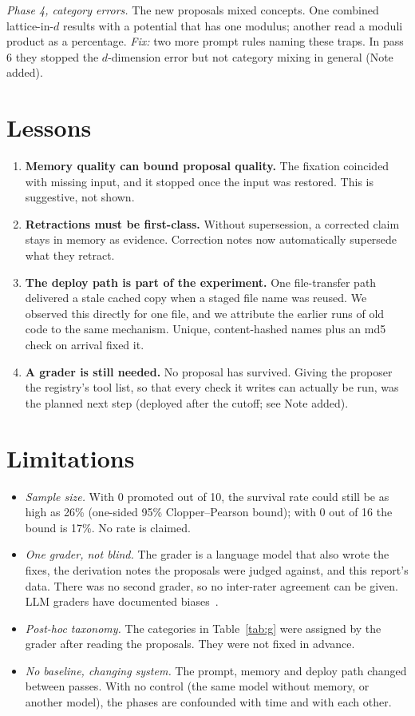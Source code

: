 \documentclass[aps,prd,twocolumn,superscriptaddress,nofootinbib,showkeys]{revtex4-2}
\begin{document}
\emph{Phase 4, category errors.} The new proposals mixed concepts. One combined lattice-in-$d$ results with a potential that has one modulus; another read a moduli product as a percentage. \emph{Fix:} two more prompt rules naming these traps. In pass 6 they stopped the $d$-dimension error but not category mixing in general (Note added).

\section{Lessons}
\begin{enumerate}
\item \textbf{Memory quality can bound proposal quality.} The fixation coincided with missing input, and it stopped once the input was restored. This is suggestive, not shown.
\item \textbf{Retractions must be first-class.} Without supersession, a corrected claim stays in memory as evidence. Correction notes now automatically supersede what they retract.
\item \textbf{The deploy path is part of the experiment.} One file-transfer path delivered a stale cached copy when a staged file name was reused. We observed this directly for one file, and we attribute the earlier runs of old code to the same mechanism. Unique, content-hashed names plus an md5 check on arrival fixed it.
\item \textbf{A grader is still needed.} No proposal has survived. Giving the proposer the registry's tool list, so that every check it writes can actually be run, was the planned next step (deployed after the cutoff; see Note added).
\end{enumerate}

\section{Limitations}
\begin{itemize}
\item \emph{Sample size.} With 0 promoted out of 10, the survival rate could still be as high as 26\% (one-sided 95\% Clopper--Pearson bound); with 0 out of 16 the bound is 17\%. No rate is claimed.
\item \emph{One grader, not blind.} The grader is a language model that also wrote the fixes, the derivation notes the proposals were judged against, and this report's data. There was no second grader, so no inter-rater agreement can be given. LLM graders have documented biases~\cite{Zheng,Panickssery}.
\item \emph{Post-hoc taxonomy.} The categories in Table~\ref{tab:g} were assigned by the grader after reading the proposals. They were not fixed in advance.
\item \emph{No baseline, changing system.} The prompt, memory and deploy path changed between passes. With no control (the same model without memory, or another model), the phases are confounded with time and with each other.
\end{itemize}
\end{document}
